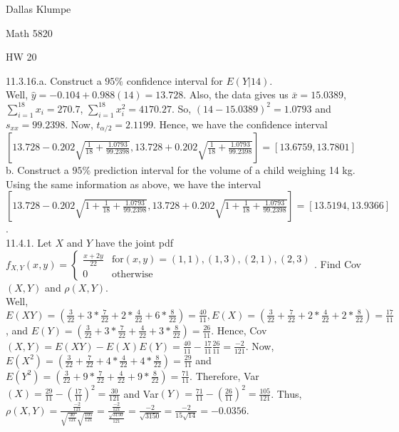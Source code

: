 \documentclass[12pt]{article}
\begin{document}
\noindent Dallas Klumpe

\noindent Math 5820

\noindent HW 20

11.3.16.a. Construct a $95\%$ confidence interval for $E(Y|14)$.\\
Well, $\hat{y}=-0.104+0.988(14)=13.728$. Also, the data gives us $\bar{x}=15.0389$, $\sum_{i=1}^{18}x_i=270.7$, $\sum_{i=1}^{18}x_i^2=4170.27$. So, $(14-15.0389)^2=1.0793$ and $s_{xx}=99.2398$. Now, $t_{\alpha/2}=2.1199$. Hence, we have the confidence interval $[13.728-0.202\sqrt{\frac{1}{18}+\frac{1.0793}{99.2398}}, 13.728+0.202\sqrt{\frac{1}{18}+\frac{1.0793}{99.2398}}]=[13.6759, 13.7801]$\\
b. Construct a $95\%$ prediction interval for the volume of a child weighing 14 kg.\\
Using the same information as above, we have the interval $[13.728-0.202\sqrt{1+\frac{1}{18}+\frac{1.0793}{99.2398}}, 13.728+0.202\sqrt{1+\frac{1}{18}+\frac{1.0793}{99.2398}}]=[13.5194, 13.9366]$.\\[20pt]

11.4.1. Let $X$ and $Y$ have the joint pdf $f_{X,Y}(x,y)=\left \{ \begin{array}{cc} \frac{x+2y}{22} & \text{for}  (x,y)=(1,1), (1,3), (2,1), (2,3) \\ 0 & \text{otherwise} \end{array} \right.$. Find Cov$(X,Y)$ and $\rho(X,Y)$.\\
Well, $E(XY)=(\frac{3}{22}+3*\frac{7}{22}+2*\frac{4}{22}+6*\frac{8}{22})=\frac{40}{11}, E(X)=(\frac{3}{22}+\frac{7}{22}+2*\frac{4}{22}+2*\frac{8}{22})=\frac{17}{11}$, and $E(Y)=(\frac{3}{22}+3*\frac{7}{22}+\frac{4}{22}+3*\frac{8}{22})=\frac{26}{11}$. Hence, Cov$(X,Y)=E(XY)-E(X)E(Y)=\frac{40}{11}-\frac{17}{11}\frac{26}{11}=\frac{-2}{121}$. Now, $E(X^2)=(\frac{3}{22}+\frac{7}{22}+4*\frac{4}{22}+4*\frac{8}{22})=\frac{29}{11}$ and $E(Y^2)=(\frac{3}{22}+9*\frac{7}{22}+\frac{4}{22}+9*\frac{8}{22})=\frac{71}{11}$. Therefore, Var$(X)=\frac{29}{11}-(\frac{17}{11})^2=\frac{30}{121}$ and Var$(Y)=\frac{71}{11}-(\frac{26}{11})^2=\frac{105}{121}$. Thus, $\rho(X,Y)=\frac{\frac{-2}{121}}{\sqrt{\frac{30}{121}}\sqrt{\frac{105}{121}}}=\frac{\frac{-2}{121}}{\frac{\sqrt{3150}}{121}}=\frac{-2}{\sqrt{3150}}=\frac{-2}{15\sqrt{14}}=-0.0356$.\\[20pt]
\end{document}

